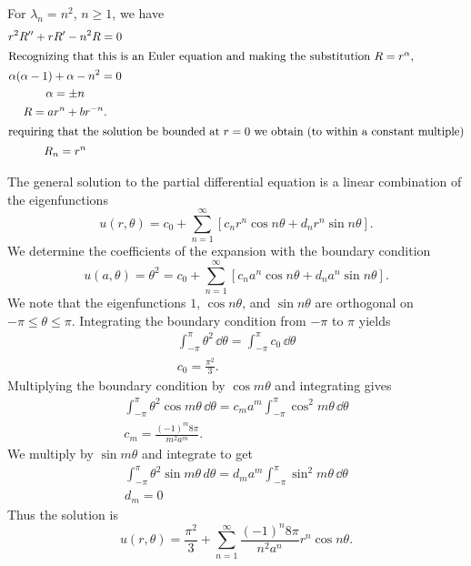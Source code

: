 For $\lambda_n = n^2$, $n \geq 1$, we have
\begin{gather*}
  r^2 R'' + r R' - n^2 R = 0 \\
  \intertext{Recognizing that this is an Euler equation and making the
    substitution $R = r^\alpha$,}
  \alpha(\alpha-1) + \alpha - n^2 = 0 \\
  \alpha = \pm n \\
  R = a r^n + b r^{-n}. \\
  \intertext{requiring that the solution be bounded at $r=0$ we obtain (to within
    a constant multiple)}
  R_n = r^n
\end{gather*}

The general solution to the partial differential equation is a linear combination of the eigenfunctions
\[ u(r,\theta) = c_0 + \sum_{n=1}^\infty \left[ c_n r^n \cos n\theta +
  d_n r^n \sin n\theta \right]. \]
We determine the coefficients of the expansion with the boundary condition
\[ u(a,\theta) = \theta^2 = c_0 + \sum_{n=1}^\infty
\left[ c_n a^n \cos n\theta + d_n a^n \sin n\theta \right]. \]
We note that the eigenfunctions $1$, $\cos n\theta$, and $\sin n\theta$ are
orthogonal on $-\pi \leq \theta \leq \pi$.  Integrating the boundary condition from $-\pi$
to $\pi$ yields
\begin{gather*}
  \int_{-\pi}^\pi \theta^2\,\dd \theta = \int_{-\pi}^\pi c_0\,\dd \theta \\
  c_0 = \frac{\pi^2}{3}.
\end{gather*}
Multiplying the boundary condition by $\cos m \theta$ and integrating gives
\begin{gather*}
  \int_{-\pi}^\pi \theta^2 \cos m\theta \,\dd \theta =
  c_m a^m \int_{-\pi}^{\pi} \cos^2 m\theta\,\dd \theta \\
  c_m = \frac{(-1)^m 8 \pi}{m^2 a^m}.
\end{gather*}
We multiply by $\sin m \theta$ and integrate to get
\begin{gather*}
  \int_{-\pi}^\pi \theta^2 \sin m\theta \, d\theta =
  d_m a^m \int_{-\pi}^{\pi} \sin^2 m\theta\,\dd \theta \\
  d_m = 0
\end{gather*}
Thus the solution is
\[ \boxed{u(r,\theta) = \frac{\pi^2}{3} +
  \sum_{n=1}^\infty \frac{(-1)^n 8 \pi}{n^2 a^n} r^n \cos n \theta. } \]











\raggedbottom
